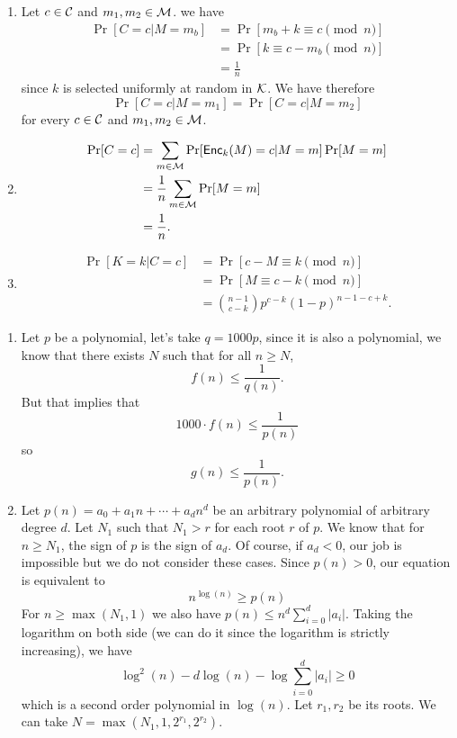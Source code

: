 \newape
\begin{solution}
  \begin{enumerate}
    \item
      Let $c \in \mathcal{C}$ and $m_1,m_2 \in \mathcal{M}$.
      we have
      \begin{align*}
        \Pr[C = c | M = m_b]
        & = \Pr[m_b + k \equiv c \pmod{n}]\\
        & = \Pr[k \equiv c - m_b \pmod{n}]\\
        & = \frac{1}{n}
      \end{align*}
      since $k$ is selected uniformly at random in $\mathcal{K}$.
      We have therefore
      \[
        \Pr[C = c | M = m_1] = \Pr[C = c | M = m_2]
      \]
      for every $c \in \mathcal{C}$ and $m_1,m_2 \in \mathcal{M}$.
    \item
      \begin{align*}
        \Pr[C = c]
        & = \sum_{m \in \mathcal{M}} \Pr[\operatorname{\mathsf{Enc}}_k(M) = c | M = m] \Pr[M = m]\\
        & = \frac{1}{n} \sum_{m \in \mathcal{M}} \Pr[M = m]\\
        & = \frac{1}{n}.
      \end{align*}
    \item
      \begin{align*}
        \Pr[K = k | C = c]
        & = \Pr[c - M \equiv k \pmod{n}]\\
        & = \Pr[M \equiv c - k \pmod{n}]\\
        & = {n-1 \choose c-k} p^{c-k} (1-p)^{n-1-c+k}.
      \end{align*}
  \end{enumerate}
\end{solution}
\begin{solution}
  \begin{enumerate}
    \item Let $p$ be a polynomial,
      let's take $q = 1000p$,
      since it is also a polynomial, we know
      that there exists $N$ such that for all $n \geq N$,
      \[ f(n) \leq \frac{1}{q(n)}. \]
      But that implies that
      \[ 1000 \cdot f(n) \leq \frac{1}{p(n)} \]
      so
      \[ g(n) \leq \frac{1}{p(n)}. \]
    \item Let $p(n) = a_0 + a_1 n + \cdots + a_dn^d$ be an
      arbitrary polynomial of arbitrary degree $d$.
      Let $N_1$ such that $N_1 > r$ for each root $r$ of $p$.
      We know that for $n \geq N_1$, the sign of $p$ is the sign of $a_d$.
      Of course, if $a_d < 0$, our job is impossible but we do not consider these cases.
      Since $p(n) > 0$, our equation is equivalent to
      \[ n^{\log(n)} \geq p(n) \]
      For $n \geq \max(N_1,1)$ we also have
      $p(n) \leq n^d \sum_{i=0}^d|a_i|$.
      Taking the logarithm on both side (we can do it since the logarithm is strictly increasing),
      we have
      \[ \log^2(n) - d \log(n) - \log\sum_{i=0}^d|a_i| \geq 0 \]
      which is a second order polynomial in $\log(n)$.
      Let $r_1,r_2$ be its roots.
      We can take $N = \max(N_1,1,2^{r_1},2^{r_2})$.
  \end{enumerate}
\end{solution}

